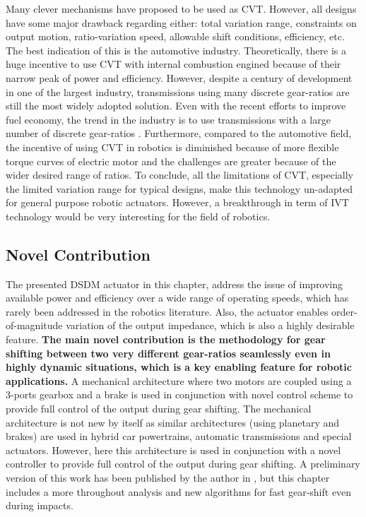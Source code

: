 Many clever mechanisms have proposed to be used as CVT. However, all designs have some major drawback regarding either: total variation range, constraints on output motion, ratio-variation speed, allowable shift conditions, efficiency, etc. The best indication of this is the automotive industry. Theoretically, there is a huge incentive to use CVT with internal combustion engined because of their narrow peak of power and efficiency. However, despite a century of development in one of the largest industry, transmissions using many discrete gear-ratios are still the most widely adopted solution. Even with the recent efforts to improve fuel economy, the trend in the industry is to use transmissions with a large number of discrete gear-ratios \cite{phillips_10-speed_2010}\cite{goleski_multi-speed_2015}. Furthermore, compared to the automotive field, the incentive of using CVT in robotics is diminished because of more flexible torque curves of electric motor and the challenges are greater because of the wider desired range of ratios. To conclude, all the limitations of CVT, especially the limited variation range for typical designs, make this technology un-adapted for general purpose robotic actuators. However, a breakthrough in term of IVT technology would be very interesting for the field of robotics.

\subsection{Novel Contribution}
The presented DSDM actuator in this chapter, address the issue of improving available power and efficiency over a wide range of operating speeds, which has rarely been addressed in the robotics literature. Also, the actuator enables order-of-magnitude variation of the output impedance, which is also a highly desirable feature.  \textbf{The main novel contribution is the methodology for gear shifting between two very different gear-ratios seamlessly even in highly dynamic situations, which is a key enabling feature for robotic applications.} A mechanical architecture where two motors are coupled using a 3-ports gearbox and a brake is used in conjunction with novel control scheme to provide full control of the output during gear shifting. The mechanical architecture is not new by itself as similar architectures (using planetary and brakes) are used in hybrid car powertrains, automatic transmissions and special actuators. However, here this architecture is used in conjunction with a novel controller to provide full control of the output during gear shifting. A preliminary version of this work has been published  by the author in \cite{girard_two-speed_2015}, but this chapter includes a more throughout analysis and new algorithms for fast gear-shift even during impacts. 

